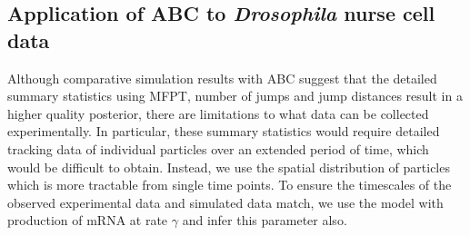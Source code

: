 \documentclass[twocolumn]{biophys}
\begin{document}
\subsection{Application of ABC to \textit{Drosophila} nurse cell data}
Although comparative simulation results with ABC suggest that the detailed summary statistics using MFPT, number of jumps and jump distances result in a higher quality posterior, there are limitations to what data can be collected experimentally.
In particular, these summary statistics would require detailed tracking data of individual particles over an extended period of time, which would be difficult to obtain. 
Instead, we use the spatial distribution of particles which is more tractable from single time points.
To ensure the timescales of the observed experimental data and simulated data match, we use the model with production of mRNA at rate $\gamma$ and infer this parameter also.
\end{document}
